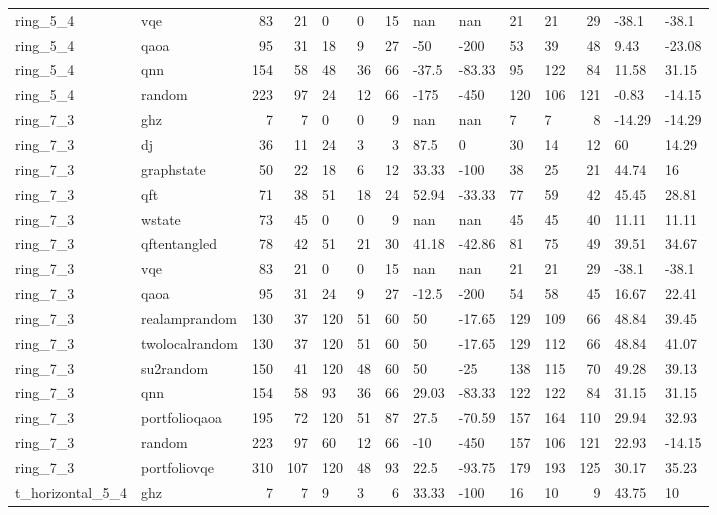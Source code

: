 \begin{longtable}{llrrllrllllrll}
ring\_5\_4 & vqe & 83 & 21 & 0 & 0 & 15 & nan & nan & 21 & 21 & 29 & -38.1 & -38.1 \\
ring\_5\_4 & qaoa & 95 & 31 & 18 & 9 & 27 & -50 & -200 & 53 & 39 & 48 & 9.43 & -23.08 \\
ring\_5\_4 & qnn & 154 & 58 & 48 & 36 & 66 & -37.5 & -83.33 & 95 & 122 & 84 & 11.58 & 31.15 \\
ring\_5\_4 & random & 223 & 97 & 24 & 12 & 66 & -175 & -450 & 120 & 106 & 121 & -0.83 & -14.15 \\
ring\_7\_3 & ghz & 7 & 7 & 0 & 0 & 9 & nan & nan & 7 & 7 & 8 & -14.29 & -14.29 \\
ring\_7\_3 & dj & 36 & 11 & 24 & 3 & 3 & 87.5 & 0 & 30 & 14 & 12 & 60 & 14.29 \\
ring\_7\_3 & graphstate & 50 & 22 & 18 & 6 & 12 & 33.33 & -100 & 38 & 25 & 21 & 44.74 & 16 \\
ring\_7\_3 & qft & 71 & 38 & 51 & 18 & 24 & 52.94 & -33.33 & 77 & 59 & 42 & 45.45 & 28.81 \\
ring\_7\_3 & wstate & 73 & 45 & 0 & 0 & 9 & nan & nan & 45 & 45 & 40 & 11.11 & 11.11 \\
ring\_7\_3 & qftentangled & 78 & 42 & 51 & 21 & 30 & 41.18 & -42.86 & 81 & 75 & 49 & 39.51 & 34.67 \\
ring\_7\_3 & vqe & 83 & 21 & 0 & 0 & 15 & nan & nan & 21 & 21 & 29 & -38.1 & -38.1 \\
ring\_7\_3 & qaoa & 95 & 31 & 24 & 9 & 27 & -12.5 & -200 & 54 & 58 & 45 & 16.67 & 22.41 \\
ring\_7\_3 & realamprandom & 130 & 37 & 120 & 51 & 60 & 50 & -17.65 & 129 & 109 & 66 & 48.84 & 39.45 \\
ring\_7\_3 & twolocalrandom & 130 & 37 & 120 & 51 & 60 & 50 & -17.65 & 129 & 112 & 66 & 48.84 & 41.07 \\
ring\_7\_3 & su2random & 150 & 41 & 120 & 48 & 60 & 50 & -25 & 138 & 115 & 70 & 49.28 & 39.13 \\
ring\_7\_3 & qnn & 154 & 58 & 93 & 36 & 66 & 29.03 & -83.33 & 122 & 122 & 84 & 31.15 & 31.15 \\
ring\_7\_3 & portfolioqaoa & 195 & 72 & 120 & 51 & 87 & 27.5 & -70.59 & 157 & 164 & 110 & 29.94 & 32.93 \\
ring\_7\_3 & random & 223 & 97 & 60 & 12 & 66 & -10 & -450 & 157 & 106 & 121 & 22.93 & -14.15 \\
ring\_7\_3 & portfoliovqe & 310 & 107 & 120 & 48 & 93 & 22.5 & -93.75 & 179 & 193 & 125 & 30.17 & 35.23 \\
t\_horizontal\_5\_4 & ghz & 7 & 7 & 9 & 3 & 6 & 33.33 & -100 & 16 & 10 & 9 & 43.75 & 10 \\

\end{longtable}
